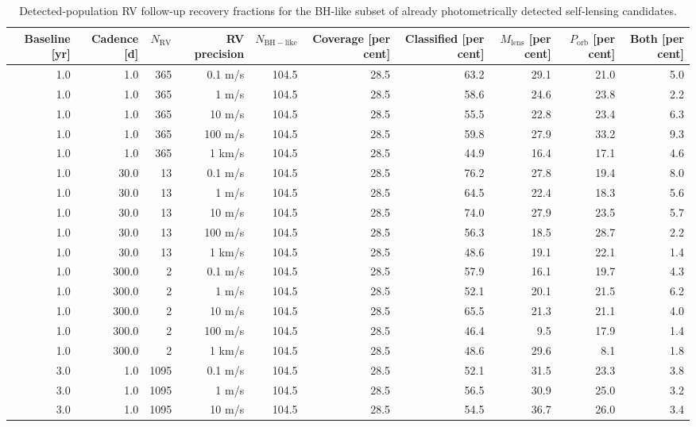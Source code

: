 \begin{table}
\centering
\scriptsize
\setlength{\tabcolsep}{2pt}
\caption{Detected-population RV follow-up recovery fractions for the BH-like subset of already photometrically detected self-lensing candidates.}
\label{tab:population-weighted-bh-followup-summary}
\begin{tabular}{rrrrrrrrrr}
\hline
Baseline [yr] & Cadence [d] & $N_\mathrm{RV}$ & RV precision & $N_\mathrm{BH-like}$ & Coverage [per cent] & Classified [per cent] & $M_\mathrm{lens}$ [per cent] & $P_\mathrm{orb}$ [per cent] & Both [per cent] \\
\hline
1.0 & 1.0 & 365 & 0.1 m/s & 104.5 & 28.5 & 63.2 & 29.1 & 21.0 & 5.0 \\
1.0 & 1.0 & 365 & 1 m/s & 104.5 & 28.5 & 58.6 & 24.6 & 23.8 & 2.2 \\
1.0 & 1.0 & 365 & 10 m/s & 104.5 & 28.5 & 55.5 & 22.8 & 23.4 & 6.3 \\
1.0 & 1.0 & 365 & 100 m/s & 104.5 & 28.5 & 59.8 & 27.9 & 33.2 & 9.3 \\
1.0 & 1.0 & 365 & 1 km/s & 104.5 & 28.5 & 44.9 & 16.4 & 17.1 & 4.6 \\
1.0 & 30.0 & 13 & 0.1 m/s & 104.5 & 28.5 & 76.2 & 27.8 & 19.4 & 8.0 \\
1.0 & 30.0 & 13 & 1 m/s & 104.5 & 28.5 & 64.5 & 22.4 & 18.3 & 5.6 \\
1.0 & 30.0 & 13 & 10 m/s & 104.5 & 28.5 & 74.0 & 27.9 & 23.5 & 5.7 \\
1.0 & 30.0 & 13 & 100 m/s & 104.5 & 28.5 & 56.3 & 18.5 & 28.7 & 2.2 \\
1.0 & 30.0 & 13 & 1 km/s & 104.5 & 28.5 & 48.6 & 19.1 & 22.1 & 1.4 \\
1.0 & 300.0 & 2 & 0.1 m/s & 104.5 & 28.5 & 57.9 & 16.1 & 19.7 & 4.3 \\
1.0 & 300.0 & 2 & 1 m/s & 104.5 & 28.5 & 52.1 & 20.1 & 21.5 & 6.2 \\
1.0 & 300.0 & 2 & 10 m/s & 104.5 & 28.5 & 65.5 & 21.3 & 21.1 & 4.0 \\
1.0 & 300.0 & 2 & 100 m/s & 104.5 & 28.5 & 46.4 & 9.5 & 17.9 & 1.4 \\
1.0 & 300.0 & 2 & 1 km/s & 104.5 & 28.5 & 48.6 & 29.6 & 8.1 & 1.8 \\
3.0 & 1.0 & 1095 & 0.1 m/s & 104.5 & 28.5 & 52.1 & 31.5 & 23.3 & 3.8 \\
3.0 & 1.0 & 1095 & 1 m/s & 104.5 & 28.5 & 56.5 & 30.9 & 25.0 & 3.2 \\
3.0 & 1.0 & 1095 & 10 m/s & 104.5 & 28.5 & 54.5 & 36.7 & 26.0 & 3.4 \\

\end{tabular}
\end{table}
